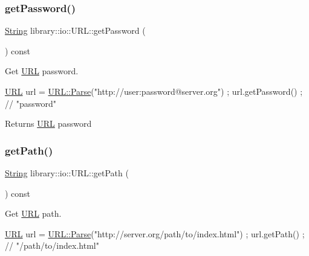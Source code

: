 \subsubsection{\texorpdfstring{get\+Password()}{getPassword()}}
{\footnotesize\ttfamily \hyperlink{namespacelibrary_1_1io_a7469b45835a4421045db344d6a5a1f85}{String} library\+::io\+::\+U\+R\+L\+::get\+Password (\begin{DoxyParamCaption}{ }\end{DoxyParamCaption}) const}



Get \hyperlink{classlibrary_1_1io_1_1_u_r_l}{U\+RL} password. 


\begin{DoxyCode}
\hyperlink{classlibrary_1_1io_1_1_u_r_l_a7e9c070138a6dbd000ffb10b7cd8a5c4}{URL} url = \hyperlink{classlibrary_1_1io_1_1_u_r_l_a03a589af0787df20428d4d33e26bb2d7}{URL::Parse}(\textcolor{stringliteral}{"http://user:password@server.org"}) ;
url.getPassword() ; \textcolor{comment}{// "password"}
\end{DoxyCode}


\begin{DoxyReturn}{Returns}
\hyperlink{classlibrary_1_1io_1_1_u_r_l}{U\+RL} password 
\end{DoxyReturn}
\mbox{\label{classlibrary_1_1io_1_1_u_r_l_ae5c4c8332a16e048fef051ab1c70c980}} 
\subsubsection{\texorpdfstring{get\+Path()}{getPath()}}
{\footnotesize\ttfamily \hyperlink{namespacelibrary_1_1io_a7469b45835a4421045db344d6a5a1f85}{String} library\+::io\+::\+U\+R\+L\+::get\+Path (\begin{DoxyParamCaption}{ }\end{DoxyParamCaption}) const}



Get \hyperlink{classlibrary_1_1io_1_1_u_r_l}{U\+RL} path. 


\begin{DoxyCode}
\hyperlink{classlibrary_1_1io_1_1_u_r_l_a7e9c070138a6dbd000ffb10b7cd8a5c4}{URL} url = \hyperlink{classlibrary_1_1io_1_1_u_r_l_a03a589af0787df20428d4d33e26bb2d7}{URL::Parse}(\textcolor{stringliteral}{"http://server.org/path/to/index.html"}) ;
url.getPath() ; \textcolor{comment}{// "/path/to/index.html"}
\end{DoxyCode}


